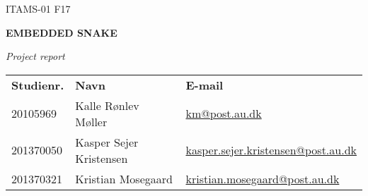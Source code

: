 \pagestyle{empty}
\BgThispage

\vspace*{12em}
\begin{minipage}[l]{\textwidth}
{\small\MakeUppercase{ITAMS-01 F17}}
\end{minipage}

\begin{minipage}[l]{\textwidth}
{\HUGE\bfseries EMBEDDED SNAKE}
\end{minipage}

\begin{minipage}[l]{\textwidth}
{\normalsize\itshape Project report}
\end{minipage}

\vspace{40em}
\begin{minipage}{\textwidth}
\begin{tabularx}{\textwidth}{@{}p{60px}XX}
\textbf{Studienr.}	&\textbf{Navn}              &\textbf{E-mail}\\
20105969            &Kalle Rønlev Møller        &\href{mailto:km@post.au.dk}{km@post.au.dk}\\
201370050           &Kasper Sejer Kristensen    &\href{mailto:kasper.sejer.kristensen@post.au.dk}{kasper.sejer.kristensen@post.au.dk}\\
201370321           &Kristian Mosegaard	        &\href{mailto:kristian.mosegaard@post.au.dk}{kristian.mosegaard@post.au.dk}
\end{tabularx}
\end{minipage}
